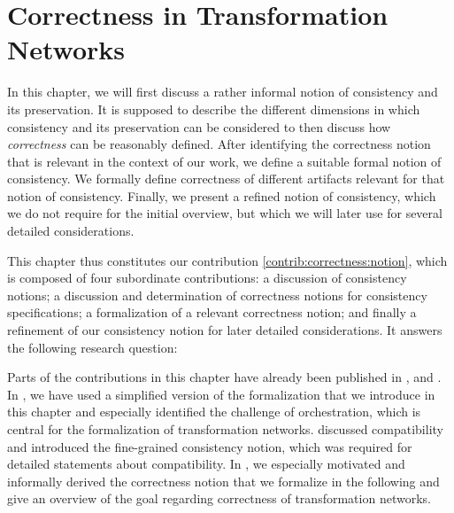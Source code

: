 \chapter{Correctness in Transformation Networks
}
\label{chap:correctness}


In this chapter, we will first discuss a rather informal notion of consistency and its preservation. It is supposed to describe the different dimensions in which consistency and its preservation can be considered to then discuss how \emph{correctness} can be reasonably defined.
After identifying the correctness notion that is relevant in the context of our work, we define a suitable formal notion of consistency.
We formally define correctness of different artifacts relevant for that notion of consistency.
Finally, we present a refined notion of consistency, which we do not require for the initial overview, but which we will later use for several detailed considerations.

This chapter thus constitutes our contribution \autoref{contrib:correctness:notion}, which is composed of four subordinate contributions: a discussion of consistency notions; a discussion and determination of correctness notions for consistency specifications; a formalization of a relevant correctness notion; and finally a refinement of our consistency notion for later detailed considerations.
It answers the following research question:


Parts of the contributions in this chapter have already been published in ,  and .
In , we have used a simplified version of the formalization that we introduce in this chapter and especially identified the challenge of orchestration, which is central for the formalization of transformation networks.
 discussed compatibility and introduced the fine-grained consistency notion, which was required for detailed statements about compatibility.
In , we especially motivated and informally derived the correctness notion that we formalize in the following and give an overview of the goal regarding correctness of transformation networks.






